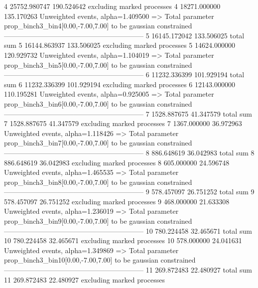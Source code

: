 4          25752.980747    190.524642      excluding marked processes    
4          18271.000000    135.170263      Unweighted events, alpha=1.409500
  => Total parameter prop_binch3_bin4[0.00,-7.00,7.00] to be gaussian constrained
------------------------------------------------------------
5          16145.172042    133.506025      total sum                     
5          16144.863937    133.506025      excluding marked processes    
5          14624.000000    120.929732      Unweighted events, alpha=1.104019
  => Total parameter prop_binch3_bin5[0.00,-7.00,7.00] to be gaussian constrained
------------------------------------------------------------
6          11232.336399    101.929194      total sum                     
6          11232.336399    101.929194      excluding marked processes    
6          12143.000000    110.195281      Unweighted events, alpha=0.925005
  => Total parameter prop_binch3_bin6[0.00,-7.00,7.00] to be gaussian constrained
------------------------------------------------------------
7          1528.887675     41.347579       total sum                     
7          1528.887675     41.347579       excluding marked processes    
7          1367.000000     36.972963       Unweighted events, alpha=1.118426
  => Total parameter prop_binch3_bin7[0.00,-7.00,7.00] to be gaussian constrained
------------------------------------------------------------
8          886.648619      36.042983       total sum                     
8          886.648619      36.042983       excluding marked processes    
8          605.000000      24.596748       Unweighted events, alpha=1.465535
  => Total parameter prop_binch3_bin8[0.00,-7.00,7.00] to be gaussian constrained
------------------------------------------------------------
9          578.457097      26.751252       total sum                     
9          578.457097      26.751252       excluding marked processes    
9          468.000000      21.633308       Unweighted events, alpha=1.236019
  => Total parameter prop_binch3_bin9[0.00,-7.00,7.00] to be gaussian constrained
------------------------------------------------------------
10         780.224458      32.465671       total sum                     
10         780.224458      32.465671       excluding marked processes    
10         578.000000      24.041631       Unweighted events, alpha=1.349869
  => Total parameter prop_binch3_bin10[0.00,-7.00,7.00] to be gaussian constrained
------------------------------------------------------------
11         269.872483      22.480927       total sum                     
11         269.872483      22.480927       excluding marked processes    
